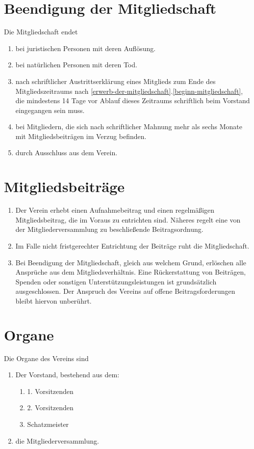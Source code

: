 \documentclass[a4paper, 12pt]{scrartcl}
\begin{document}
\section{Beendigung der Mitgliedschaft}
Die Mitgliedschaft endet
\begin{enumerate}
	\item bei juristischen Personen mit deren Auflösung.
	\item bei natürlichen Personen mit deren Tod.
	\item nach schriftlicher Austrittserklärung eines Mitglieds zum Ende des Mitgliedszeitraums nach \ref{erwerb-der-mitgliedschaft}.\ref{beginn-mitgliedschaft}, die mindestens 14 Tage vor Ablauf dieses Zeitraums schriftlich beim Vorstand eingegangen sein muss.
	\item bei Mitgliedern, die sich nach schriftlicher Mahnung mehr als sechs Monate mit Mitgliedsbeiträgen im Verzug befinden.
	\item durch Ausschluss aus dem Verein.
\end{enumerate}

\section{Mitgliedsbeiträge}
\begin{enumerate}
	\item Der Verein erhebt einen Aufnahmebeitrag und einen regelmäßigen Mitgliedsbeitrag, die im Voraus zu entrichten sind. Näheres regelt eine von der Mitgliederversammlung zu beschließende Beitragsordnung.
	\item Im Falle nicht fristgerechter Entrichtung der Beiträge ruht die Mitgliedschaft.
	\item Bei Beendigung der Mitgliedschaft, gleich aus welchem Grund, erlöschen alle Ansprüche aus dem Mitgliedsverhältnis. Eine Rückerstattung von Beiträgen, Spenden oder sonstigen Unterstützungsleistungen ist grundsätzlich ausgeschlossen. Der Anspruch des Vereins auf offene Beitragsforderungen bleibt hiervon unberührt.
\end{enumerate}

\section{Organe}
Die Organe des Vereins sind
\begin{enumerate}
	\item Der Vorstand, bestehend aus dem:
	\begin{enumerate}
		\item 1. Vorsitzenden
		\item 2. Vorsitzenden
		\item Schatzmeister
	\end{enumerate}
	\item die Mitgliederversammlung.
\end{enumerate}
\end{document}
